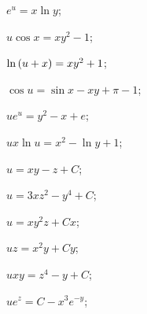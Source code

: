 \begin{enumsols}
		\label{sol:nonlinsys_partialsyst:systems2cauchy_hard}
		\item \( e^u = x \ln{y} \); \sfill %
		\item \( u \cos{x} = xy^2 - 1 \); \sfill %
		\item \( \ln\left( u+x \right) = xy^2 + 1 \); \sfill %
		\item \( \cos{u} = \sin{x} - xy + \pi - 1 \); \sfill %
		\item \( u e^{u} = y^2 - x + e \); \sfill %
		\item \( ux \ln{u} = x^2 - \ln{y} + 1 \); \sfill %
		
		\label{sol:nonlinsys_partialsyst:systems3}
		\item \( u = xy - z + C \); \sfill %
		\item \( u = 3xz^2 - y^4 + C \); \sfill %
		\item \( u = xy^2 z + Cx \); \sfill %
		\item \( uz = x^2 y + Cy \); \sfill %
		\item \( uxy = z^4 - y + C \); \sfill %
		\item \( u e^z = C - x^3 e^{-y} \); \sfill %
		

\end{enumsols}
